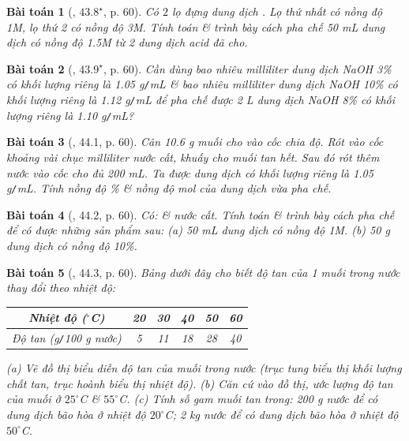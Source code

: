 \documentclass{article}
\newtheorem{baitoan}{Bài toán}
\begin{document}
\begin{baitoan}[\cite{SBT_Hoa_Hoc_8}, $43.8^\star$, p. 60]
	Có $2$ lọ đựng dung dịch \emph{}. Lọ thứ nhất có nồng độ \emph{1M}, lọ thứ 2 có nồng độ \emph{3M}. Tính toán \& trình bày cách pha chế \emph{50 mL} dung dịch \emph{} có nồng độ \emph{1.5M} từ 2 dung dịch acid đã cho.
\end{baitoan}

\begin{baitoan}[\cite{SBT_Hoa_Hoc_8}, $43.9^\star$, p. 60]
	Cần dùng bao nhiêu milliliter dung dịch \emph{NaOH 3\%} có khối lượng riêng là \emph{1.05 g\texttt{/}mL} \& bao nhiêu milliliter dung dịch \emph{NaOH 10\%} có khối lượng riêng là \emph{1.12 g\texttt{/}mL} để pha chế được \emph{2 L} dung dịch \emph{NaOH 8\%} có khối lượng riêng là \emph{1.10 g\texttt{/}mL?}
\end{baitoan}

\begin{baitoan}[\cite{SBT_Hoa_Hoc_8}, 44.1, p. 60]
	Cân \emph{10.6 g} muối \emph{} cho vào cốc chia độ. Rót vào cốc khoảng vài chục milliliter nước cất, khuấy cho muối tan hết. Sau đó rót thêm nước vào cốc cho đủ \emph{200 mL}. Ta được dung dịch \emph{} có khối lượng riêng là \emph{1.05 g\texttt{/}mL}. Tính nồng độ \% \& nồng độ mol của dung dịch vừa pha chế.
\end{baitoan}

\begin{baitoan}[\cite{SBT_Hoa_Hoc_8}, 44.2, p. 60]
	Có: \emph{} \& nước cất. Tính toán \& trình bày cách pha chế để có được những sản phẩm sau: (a) \emph{50 mL} dung dịch \emph{} có nồng độ \emph{1M}. (b) \emph{50 g} dung dịch \emph{} có nồng độ \emph{10\%}.
\end{baitoan}

\begin{baitoan}[\cite{SBT_Hoa_Hoc_8}, 44.3, p. 60]
	Bảng dưới đây cho biết độ tan của 1 muối trong nước thay đổi theo nhiệt độ:
	\begin{table}[H]
		\centering
		\begin{tabular}{|c|c|c|c|c|c|}
			\hline
			Nhiệt độ (${}^\circ$C) & 20 & 30 & 40 & 50 & 60 \\
			\hline
			Độ tan (g\texttt{/}100 g nước) & 5 & 11 & 18 & 28 & 40 \\
			\hline
		\end{tabular}
	\end{table}
	\noindent(a) Vẽ đồ thị biểu diễn độ tan của muối trong nước (trục tung biểu thị khối lượng chất tan, trục hoành biểu thị nhiệt độ). (b) Căn cứ vào đồ thị, ước lượng độ tan của muối ở $25^\circ$\emph{C} \& $55^\circ$\emph{C}. (c) Tính số gam muối tan trong: \emph{200 g} nước để có dung dịch bão hòa ở nhiệt độ $20^\circ$\emph{C}; \emph{2 kg} nước để có dung dịch bão hòa ở nhiệt độ $50^\circ$\emph{C}.
\end{baitoan}
\end{document}
